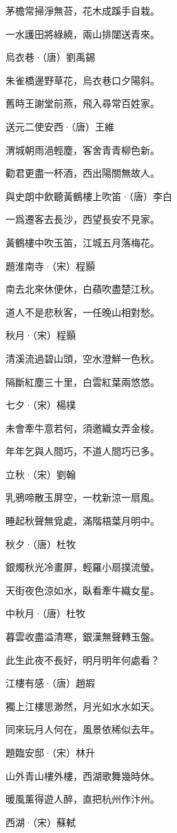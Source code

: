 \documentclass[12pt,a4paper]{ctexbook}
\begin{document}
茅檐常掃淨無苔，花木成蹊手自栽。\par
一水護田將綠繞，兩山排闥送青來。\par
烏衣巷·（唐）劉禹錫\par
朱雀橋邊野草花，烏衣巷口夕陽斜。\par
舊時王謝堂前燕，飛入尋常百姓家。\par
送元二使安西·（唐）王維\par
渭城朝雨浥輕塵，客舍青青柳色新。\par
勸君更盡一杯酒，西出陽關無故人。\par
與史朗中飲聽黃鶴樓上吹笛·（唐）李白\par
一爲遷客去長沙，西望長安不見家。\par
黃鶴樓中吹玉笛，江城五月落梅花。\par
題淮南寺·（宋）程顥\par
南去北來休便休，白蘋吹盡楚江秋。\par
道人不是悲秋客，一任晚山相對愁。\par
秋月·（宋）程顥\par
清溪流過碧山頭，空水澄鮮一色秋。\par
隔斷紅塵三十里，白雲紅葉兩悠悠。\par
七夕·（宋）楊樸\par
未會牽牛意若何，須邀織女弄金梭。\par
年年乞與人間巧，不道人間巧已多。\par
立秋·（宋）劉翰\par
乳鴉啼散玉屏空，一枕新涼一扇風。\par
睡起秋聲無覓處，滿階梧葉月明中。\par
秋夕·（唐）杜牧\par
銀燭秋光冷畫屏，輕羅小扇撲流螢。\par
天街夜色涼如水，臥看牽牛織女星。\par
中秋月·（唐）杜牧\par
暮雲收盡溢清寒，銀漢無聲轉玉盤。\par
此生此夜不長好，明月明年何處看？\par
江樓有感·（唐）趙嘏\par
獨上江樓思渺然，月光如水水如天。\par
同來玩月人何在，風景依稀似去年。\par
題臨安邸·（宋）林升\par
山外青山樓外樓，西湖歌舞幾時休。\par
暖風薰得遊人醉，直把杭州作汴州。\par
西湖·（宋）蘇軾\par
\end{document}

